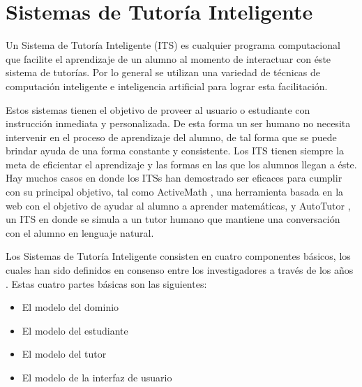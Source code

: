 
\chapter{Sistemas de Tutoría Inteligente}

Un Sistema de Tutoría Inteligente (ITS) es cualquier programa computacional
que facilite el aprendizaje de un alumno al momento de interactuar con
éste sistema de tutorías. Por lo general se utilizan una variedad de
técnicas de computación inteligente e inteligencia artificial para
lograr esta facilitación.

Estos sistemas tienen el objetivo de proveer al usuario o estudiante
con instrucción inmediata y personalizada. De esta forma un ser humano
no necesita intervenir en el proceso de aprendizaje del alumno, de tal
forma que se puede brindar ayuda de una forma constante y
consistente. Los ITS tienen siempre la meta de eficientar el
aprendizaje y las formas en las que los alumnos llegan a éste. Hay
muchos casos en donde los ITSs han demostrado ser eficaces para
cumplir con su principal objetivo, tal como ActiveMath
\cite{melis2004activemath}, una herramienta basada en la web con el
objetivo de ayudar al alumno a aprender matemáticas, y AutoTutor
\cite{graesser2005autotutor}, un ITS en donde se simula a un tutor
humano que mantiene una conversación con el alumno en lenguaje
natural.


Los Sistemas de Tutoría Inteligente consisten en cuatro componentes
básicos, los cuales han sido definidos en consenso entre los
investigadores a través de los años \cite{nwana1990intelligent}
\cite{freedman2000links} \cite{nkambou2010advances}. Estas cuatro
partes básicas son las siguientes:

\begin{itemize}
  \item El modelo del dominio
  \item El modelo del estudiante
  \item El modelo del tutor
  \item El modelo de la interfaz de usuario
\end{itemize}

